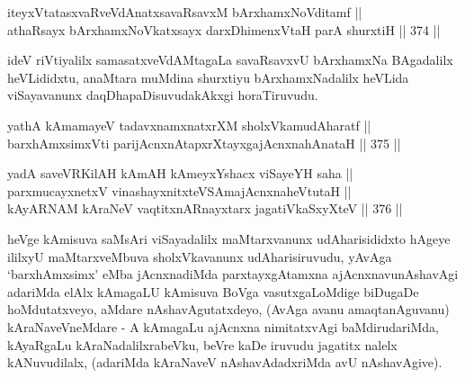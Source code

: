 \begin{shl}
iteyxVtatasxvaRveVdAnatxsavaRsavxM bArxhamxNoVditamf || \\
athaRsayx bArxhamxNoVkatxsayx darxDhimenxV\s taH parA shurxtiH \hfill || 374 ||  
\end{shl}

\begin{artha}
ideV riVtiyalilx samasatxveVdAMtagaLa savaRsavxvU bArxhamxNa
BAgadalilx heVLididxtu, anaMtara muMdina shurxtiyu bArxhamxNadalilx
heVLida viSayavanunx daqDhapaDisuvudakAkxgi horaTiruvudu.
\end{artha}

\begin{shl}
\footnotemark[1]yathA kAmamayeV tadavxnamxnatxrXM sholxVkamudAharatf || \\
barxhAmxsimxVti parijAcnxnAtapxrXtayxgajAcnxnahAnataH \hfill || 375 ||  
\end{shl}

\begin{shl}
yadA saveVR\s KilAH kAmAH kAmeyxYshacx viSayeYH saha || \\
parxmucayxnetxV vinashayxnitx\footnotemark[2] teVSA\footnotemark[3]majAcnxnaheVtutaH || \\
kAyARNAM kAraNeV vaqtitxnARnayxtarx jagatiVkaSxyXteV \hfill || 376 ||  
\end{shl}

\begin{artha}
heVge kAmisuva saMsAri viSayadalilx maMtarxvanunx udAharisididxto
hAgeye ililxyU maMtarxveMbuva sholxVkavanunx udAharisiruvudu, yAvAga
`barxhAmxsimx' eMba jAcnxnadiMda parxtayxgAtamxna ajAcnxnavunAshavAgi
adariMda elAlx kAmagaLU kAmisuva BoVga vasutxgaLoMdige biDugaDe
hoMdutatxveyo, aMdare nAshavAgutatxdeyo, (AvAga avanu amaqtanAguvanu)
kAraNaveVneMdare - A kAmagaLu ajAcnxna nimitatxvAgi baMdirudariMda,
kAyaRgaLu kAraNadalilxrabeVku, beVre kaDe iruvudu jagatitx nalelx
kANuvudilalx, (adariMda kAraNaveV nAshavAdadxriMda avU nAshavAgive).
\end{artha}

